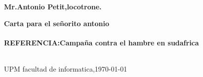 \documentclass{letter}      %
\date{\today}               %
\begin{document}
\begin{letter}{\textbf{Mr.Antonio Petit,locotrone.}} %
  \opening{\textbf{Carta para el señorito antonio\\
      \\
      REFERENCIA:Campaña contra el hambre en sudafrica}\\\\
  }
  \closing{UPM facultad de informatica,\today}
\end{letter}
\end{document}
